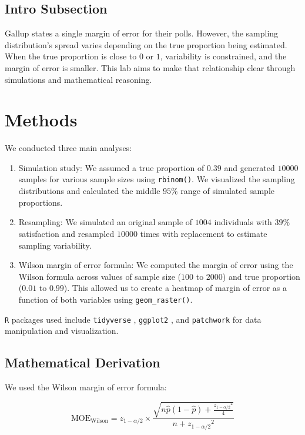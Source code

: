 \documentclass{article}\usepackage[]{graphicx}\usepackage[]{xcolor}
\begin{document}
\begin{multicols}{2}
\subsection{Intro Subsection}
Gallup states a single margin of error for their polls. However, the sampling distribution's spread varies depending on the true proportion being estimated. When the true proportion is close to $0$ or $1$, variability is constrained, and the margin of error is smaller. This lab aims to make that relationship clear through simulations and mathematical reasoning.

\section{Methods}

We conducted three main analyses:
\begin{enumerate}
\item Simulation study: We assumed a true proportion of $0.39$ and generated $10000$ samples for various sample sizes using \texttt{rbinom()}. We visualized the sampling distributions and calculated the middle $95\%$ range of simulated sample proportions.
\item Resampling: We simulated an original sample of $1004$ individuals with $39\%$ satisfaction and resampled $10000$ times with replacement to estimate sampling variability.
\item Wilson margin of error formula: We computed the margin of error using the Wilson formula across values of sample size ($100$ to $2000$) and true proportion ($0.01$ to $0.99$). This allowed us to create a heatmap of margin of error as a function of both variables using \texttt{geom\_raster()}.
\end{enumerate}

\noindent \texttt{R} packages used include \texttt{tidyverse} \citep{tidyverse}, \texttt{ggplot2} \citep{ggplot}, and \texttt{patchwork} \citep{patch} for data manipulation and visualization.

\subsection{Mathematical Derivation}

We used the Wilson margin of error formula:

\[
\text{MOE}_{\text{Wilson}} = z_{1-\alpha/2} \times \frac{ \sqrt{ n\hat{p}(1-\hat{p}) + \frac{{z_{1-\alpha/2}}^2}{4} } }{ n + {z_{1-\alpha/2}}^2 }
\]



\end{multicols}
\end{document}
